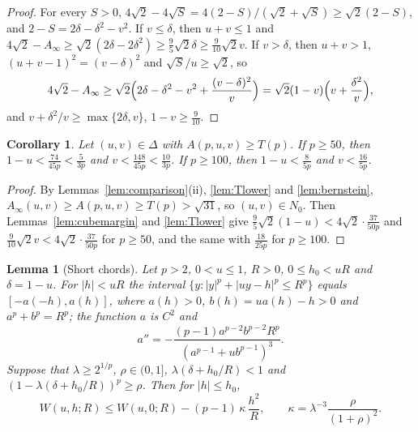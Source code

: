 \documentclass[11pt]{amsart}
\newtheorem{lemma}[theorem]{Lemma}
\newtheorem{corollary}[theorem]{Corollary}
\theoremstyle{definition}
\theoremstyle{remark}
\numberwithin{equation}{section}
\begin{document}
\begin{proof}
For every $S>0$, $4\sqrt2-4\sqrt S=4(2-S)/(\sqrt2+\sqrt S)\ge\sqrt2(2-S)$, and $2-S=2\delta-\delta^2-v^2$. If $v\le\delta$, then $u+v\le1$ and $4\sqrt2-A_\infty\ge\sqrt2(2\delta-2\delta^2)\ge\frac95\sqrt2\delta\ge\frac9{10}\sqrt2 v$. If $v>\delta$, then $u+v>1$, $(u+v-1)^2=(v-\delta)^2$ and $\sqrt S/u\ge\sqrt2$, so
\[
4\sqrt2-A_\infty\ge\sqrt2\Bigl(2\delta-\delta^2-v^2+\frac{(v-\delta)^2}v\Bigr)=\sqrt2(1-v)\Bigl(v+\frac{\delta^2}v\Bigr),
\]
and $v+\delta^2/v\ge\max\{2\delta,v\}$, $1-v\ge\frac9{10}$.
\end{proof}

\begin{corollary}\label{cor:confine}
Let $(u,v)\in\Delta$ with $A(p,u,v)\ge T(p)$. If $p\ge50$, then $1-u<\frac{74}{45p}<\frac5{3p}$ and $v<\frac{148}{45p}<\frac{10}{3p}$. If $p\ge100$, then $1-u<\frac8{5p}$ and $v<\frac{16}{5p}$.
\end{corollary}

\begin{proof}
By Lemmas~\ref{lem:comparison}(ii), \ref{lem:Tlower} and \ref{lem:bernstein}, $A_\infty(u,v)\ge A(p,u,v)\ge T(p)>\sqrt{31}$, so $(u,v)\in N_0$. Then Lemmas~\ref{lem:cubemargin} and \ref{lem:Tlower} give $\frac95\sqrt2(1-u)<4\sqrt2\cdot\frac{37}{50p}$ and $\frac9{10}\sqrt2v<4\sqrt2\cdot\frac{37}{50p}$ for $p\ge50$, and the same with $\frac{18}{25p}$ for $p\ge100$.
\end{proof}

\begin{lemma}[Short chords]\label{lem:shortchord}
Let $p>2$, $0<u\le1$, $R>0$, $0\le h_0<uR$ and $\delta=1-u$. For $|h|<uR$ the interval $\{y:|y|^p+|uy-h|^p\le R^p\}$ equals $[-a(-h),a(h)]$, where $a(h)>0$, $b(h)=ua(h)-h>0$ and $a^p+b^p=R^p$; the function $a$ is $C^2$ and
\begin{equation}\label{eq:app}
a''=-\frac{(p-1)a^{p-2}b^{p-2}R^p}{(a^{p-1}+ub^{p-1})^3}.
\end{equation}
Suppose that $\lambda\ge2^{1/p}$, $\rho\in(0,1]$, $\lambda(\delta+h_0/R)<1$ and $(1-\lambda(\delta+h_0/R))^p\ge\rho$. Then for $|h|\le h_0$,
\[
W(u,h;R)\le W(u,0;R)-(p-1)\,\kappa\,\frac{h^2}R,\qquad \kappa=\lambda^{-3}\frac{\rho}{(1+\rho)^2}.
\]
\end{lemma}
\end{document}
